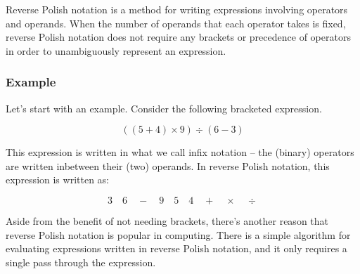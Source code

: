 \documentclass[addpoints,12pt]{exam}
\begin{document}


\noindent
Reverse Polish notation is a method for writing expressions involving operators and operands.
When the number of operands that each operator takes is fixed, reverse Polish notation does not require any brackets or precedence of operators in order to unambiguously represent an expression.

\subsubsection*{Example}
Let’s start with an example.
Consider the following bracketed expression.

$$ ((5 + 4) \times 9) \div (6 - 3) $$

This expression is written in what we call infix notation -- the (binary) operators are written inbetween their (two) operands.
In reverse Polish notation, this expression is written as:

$$ 3 \quad 6 \quad - \quad 9 \quad 5 \quad 4 \quad + \quad \times \quad \div $$

Aside from the benefit of not needing brackets, there’s another reason that reverse Polish notation is popular in computing.
There is a simple algorithm for evaluating expressions written in reverse Polish notation, and it only requires a single pass through the expression.



\end{document}
